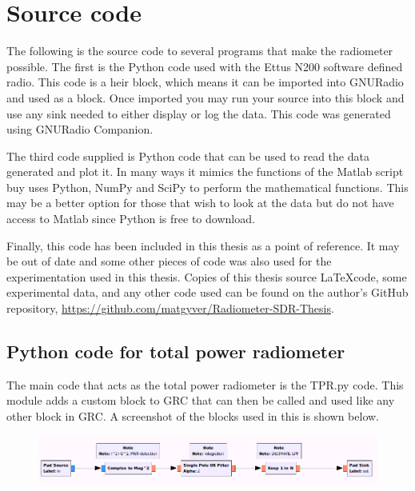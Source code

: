 \appendixtitle
\appendix
\chapter{Source code}

The following is the source code to several programs that make the radiometer possible.  The first is the Python code used with the Ettus N200 software defined radio.  This code is a heir block, which means it can be imported into GNURadio and used as a block.  Once imported you may run your source into this block and use any sink needed to either display or log the data.  This code was generated using GNURadio Companion.  


The third code supplied is Python code that can be used to read the data generated and plot it.  In many ways it mimics the functions of the Matlab script buy uses Python, NumPy and SciPy to perform the mathematical functions.  This may be a better option for those that wish to look at the data but do not have access to Matlab since Python is free to download.

Finally, this code has been included in this thesis as a point of reference.  It may be out of date and some other pieces of code was also used for the experimentation used in this thesis.  Copies of this thesis source \LaTeX code, some experimental data, and any other code used can be found on the author's GitHub repository, \url{https://github.com/matgyver/Radiometer-SDR-Thesis}.


\section*{Python code for total power radiometer}
The main code that acts as the total power radiometer is the TPR.py code.  This module adds a custom block to GRC that can then be called and used like any other block in GRC.  A screenshot of the blocks used in this is shown below.

{\begin{figure}[h!tb] 
\centering
\includegraphics[width=0.8\linewidth]{Images/TPR_grc.png}
\label{TPR_GRC}
\end{figure}

}


